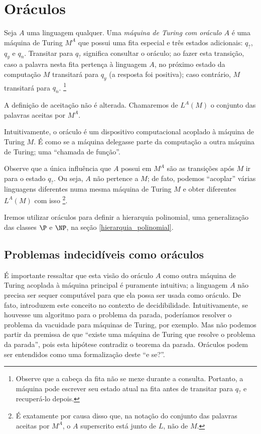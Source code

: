 \section{Oráculos}

\begin{definition}
    Seja $A$ uma linguagem qualquer.
    Uma \emph{máquina de Turing com oráculo $A$}
    é uma máquina de Turing $M^A$ que possui uma fita especial
    e três estados adicionais: $q_?$, $q_y$ e $q_n$.
    Transitar para $q_?$ significa consultar o oráculo;
    ao fazer esta transição,
    caso a palavra nesta fita pertença à linguagem $A$,
    no próximo estado da computação $M$ transitará para $q_y$
    (a resposta foi positiva);
    caso contrário, $M$ transitará para $q_n$.
    \footnote{
        Observe que a cabeça da fita não se mexe durante a consulta.
        Portanto, a máquina pode escrever seu estado atual na fita
        antes de transitar para $q_?$ e recuperá-lo depois.
    }

    A definição de aceitação não é alterada.
    Chamaremos de $L^A(M)$ o conjunto das palavras aceitas por $M^A$.
\end{definition}

Intuitivamente, o oráculo é um dispositivo computacional
acoplado à máquina de Turing $M$.
É como se a máquina delegasse parte da computação
a outra máquina de Turing;
uma ``chamada de função''.

Observe que a única influência que $A$ possui em $M^A$
são as transições após $M$ ir para o estado $q_?$.
Ou seja, $A$ não pertence a $M$;
de fato, podemos ``acoplar'' várias linguagens diferentes
numa mesma máquina de Turing $M$
e obter diferentes $L^A(M)$ com isso%
\footnote{
    É exatamente por causa disso que,
    na notação do conjunto das palavras aceitas por $M^A$,
    o $A$ superscrito está junto de $L$, não de $M$.
}.

Iremos utilizar oráculos para definir a hierarquia polinomial,
uma generalização das classes $\P$ e $\NP$,
na seção \ref{hierarquia_polinomial}.

\subsection{Problemas indecidíveis como oráculos}

É importante ressaltar que esta visão do oráculo $A$
como outra máquina de Turing acoplada à máquina principal
é puramente intuitiva;
a linguagem $A$ não precisa ser sequer computável
para que ela possa ser usada como oráculo.
De fato, 
introduzem este conceito no contexto de decidibilidade.
Intuitivamente, se houvesse um algoritmo para o problema da parada,
poderíamos resolver o problema da vacuidade para máquinas de Turing,
por exemplo.
Mas não podemos partir da premissa de que
``existe uma máquina de Turing que resolve o problema da parada'',
pois esta hipótese contradiz o teorema da parada.
Oráculos podem ser entendidos como uma formalização deste ``e se?''.


